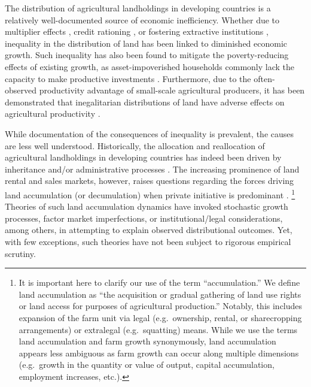 \documentclass[english]{article}
\begin{document}
The distribution of agricultural landholdings in developing countries is a 
relatively well-documented source of economic inefficiency.
Whether due to multiplier effects \citep{mellor1976}, credit rationing 
\citep{deininger1998}, or fostering extractive institutions 
\citep{acemoglu2002}, inequality in the distribution of land has been linked 
to diminished economic growth.
Such inequality has also been found to mitigate the poverty-reducing effects 
of existing growth, as asset-impoverished households commonly lack the capacity 
to make productive investments \citep{deininger1998, ravallion2002, lipton2009}.
Furthermore, due to the often-observed productivity advantage of small-scale 
agricultural producers, it has been demonstrated that inegalitarian distributions of 
land have adverse effects on agricultural productivity  
\citep{eswaran1986, vollrath2007, lipton2009}.

While documentation of the consequences of inequality is prevalent, the causes 
are less well understood.
Historically, the allocation and reallocation of agricultural landholdings in 
developing countries has indeed been driven by inheritance and/or administrative
processes \citep{binswanger1995, deininger2001, lipton2009}.
The increasing prominence of land rental and sales markets, however, raises 
questions regarding the forces driving land accumulation (or decumulation) 
when private initiative is predominant
\citep{deininger2005, deininger2008b, holden2009}.%
\footnote{It is important here to clarify our use of the term ``accumulation.''
We define land accumulation as ``the acquisition or gradual gathering of land 
use rights or land access for purposes of agricultural production.''  
Notably, this includes expansion of the farm unit via legal (e.g.\ ownership, 
rental, or sharecropping arrangements) or extralegal (e.g.\ squatting) means.
While we use the terms land accumulation and farm growth synonymously, 
land accumulation appears less ambiguous as farm growth can occur along
multiple dimensions (e.g.\ growth in the quantity or value of output, capital
accumulation, employment increases, etc.).}
Theories of such land accumulation dynamics have invoked stochastic growth 
processes, factor market imperfections, or institutional/legal considerations, 
among others, in attempting to explain observed distributional outcomes.
Yet, with few exceptions, such theories have not been subject to rigorous
empirical scrutiny.
\end{document}
